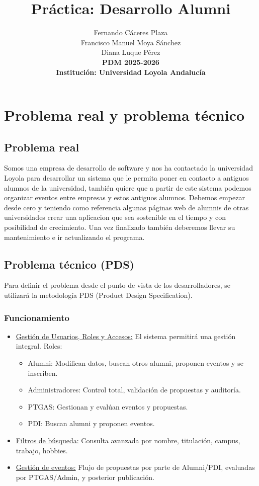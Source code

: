 \documentclass{report}
\title{\textbf{Práctica: Desarrollo Alumni}}
\author{
    Fernando Cáceres Plaza\\
    Francisco Manuel Moya Sánchez\\
    Diana Luque Pérez\\
    \textbf{PDM 2025-2026} \\
    \textbf{Institución: Universidad Loyola Andalucía}
}
\date{}
\begin{document}
\maketitle
\newpage
{}
\setcounter{page}{1}
\tableofcontents
\newpage

\section{Problema real y problema técnico}
\subsection{Problema real}
Somos una empresa de desarrollo de software y nos ha contactado la universidad Loyola para desarrollar un sistema que le permita poner en contacto a antiguos alumnos de la universidad, también quiere que a partir de este sistema podemos organizar eventos entre empresas y estos antiguos alumnos. Debemos empezar desde cero y teniendo como referencia algunas páginas web de alumnis de otras universidades crear una aplicacion que sea sostenible en el tiempo y con posibilidad de crecimiento. Una vez finalizado también deberemos llevar su mantenimiento e ir actualizando el programa.

\subsection{Problema técnico (PDS)}
Para definir el problema desde el punto de vista de los desarrolladores, se utilizará la metodología PDS (Product Design Specification).

\subsubsection{Funcionamiento}
\begin{itemize}
    \item{\underline{Gestión de Usuarios, Roles y Accesos:}} El sistema permitirá una gestión integral. Roles:
        \begin{itemize}
            \item{Alumni:} Modifican datos, buscan otros alumni, proponen eventos y se inscriben.
            \item{Administradores:} Control total, validación de propuestas y auditoría.
            \item{PTGAS:} Gestionan y evalúan eventos y propuestas.
            \item{PDI:} Buscan alumni y proponen eventos.
        \end{itemize}
    \item{\underline{Filtros de búsqueda:}} Consulta avanzada por nombre, titulación, campus, trabajo, hobbies.
    \item{\underline{Gestión de eventos:}} Flujo de propuestas por parte de Alumni/PDI, evaluadas por PTGAS/Admin, y posterior publicación.
\end{itemize}
\end{document}
